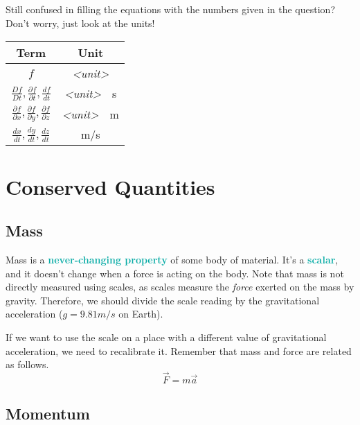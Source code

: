 \documentclass[twoside]{article}
\newcommand{\highlightbluetext}[1]{\textcolor[HTML]{09ACA6}{\textbf{#1}}}
\numberwithin{equation}{section}
\begin{document}
	Still confused in filling the equations with the numbers given in the question? Don't worry, just look at the units!
	\begin{center}
		\begin{tabular}{c c}
			\textbf{Term} & \textbf{Unit} \\
			\hline
			$\displaystyle f$ & \emph{<unit>} \\[10pt]
			$\displaystyle \frac{Df}{Dt}, \frac{\partial f}{\partial t}, \frac{df}{dt}$ & \unit{\emph{<unit>} \per \second} \\[10pt]
			$\displaystyle \frac{\partial f}{\partial x}, \frac{\partial f}{\partial y}, \frac{\partial f}{\partial z}$ & \unit{\emph{<unit>} \per \metre} \\[10pt]
			$\displaystyle \frac{dx}{dt}, \frac{dy}{dt}, \frac{dz}{dt}$ & \unit{m/s}
		\end{tabular}
	\end{center}
	
	\newpage

	\section{Conserved Quantities}
	\label{sec:ConservedQuantities}
	
	\subsection{Mass}
	\label{subsec:Mass}
	
	Mass is a \highlightbluetext{never-changing property} of some body of material. It's a \highlightbluetext{scalar}, and it doesn't change when a force is acting on the body. Note that mass is not directly measured using scales, as scales measure the \emph{force} exerted on the mass by gravity. Therefore, we should divide the scale reading by the gravitational acceleration ($g = 9.81 \unit{m/s}$ on Earth).
	
	If we want to use the scale on a place with a different value of gravitational acceleration, we need to recalibrate it. Remember that mass and force are related as follows.
	\begin{equation*}
		\vec{F} = m \vec{a}
	\end{equation*}
	
	\subsection{Momentum}
	\label{subsec:Momentum}
	
\end{document}

